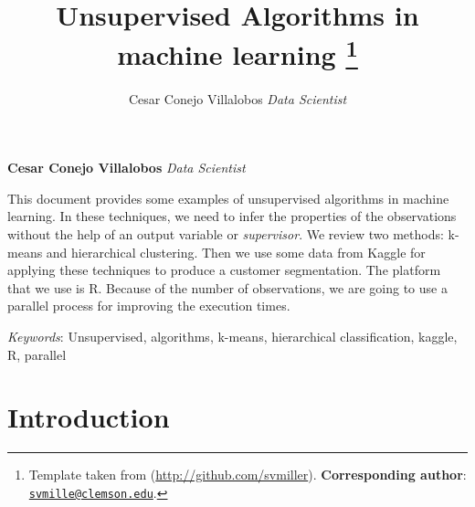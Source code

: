 \documentclass[11pt,]{article}
\title{Unsupervised Algorithms in machine learning \thanks{Template taken from (\url{http://github.com/svmiller}).
\textbf{Corresponding author}:
\href{mailto:svmille@clemson.edu}{\nolinkurl{svmille@clemson.edu}}.}  }
\author{\Large Cesar Conejo Villalobos\vspace{0.05in} \newline\normalsize\emph{Data Scientist}  }
\date{}
\newcommand*{\authorfont}{\fontfamily{phv}\selectfont}
\renewenvironment{abstract}
 {{%
    \setlength{\leftmargin}{0mm}
    \setlength{\rightmargin}{\leftmargin}%
  }%
  \relax}
 {\endlist}
\begin{document}
	
%

{%
\setlength{\parindent}{0pt}
\thispagestyle{plain}
{\fontsize{18}{20}\selectfont\raggedright 
\maketitle  %

}

{
   \vskip 13.5pt\relax \normalsize\fontsize{11}{12} 
\textbf{\authorfont Cesar Conejo Villalobos} \hskip 15pt \emph{\small Data Scientist}   

}

}








\begin{abstract}

    \hbox{\vrule height .2pt width 39.14pc}

    \vskip 8.5pt %

\noindent This document provides some examples of unsupervised algorithms in
machine learning. In these techniques, we need to infer the properties
of the observations without the help of an output variable or
\emph{supervisor}. We review two methods: k-means and hierarchical
clustering. Then we use some data from Kaggle for applying these
techniques to produce a customer segmentation. The platform that we use
is R. Because of the number of observations, we are going to use a
parallel process for improving the execution times.


\vskip 8.5pt \noindent \emph{Keywords}: Unsupervised, algorithms, k-means, hierarchical classification, kaggle,
R, parallel \par

    \hbox{\vrule height .2pt width 39.14pc}



\end{abstract}


\vskip -8.5pt



\noindent  

\section{Introduction}\label{introduction}
\end{document}
